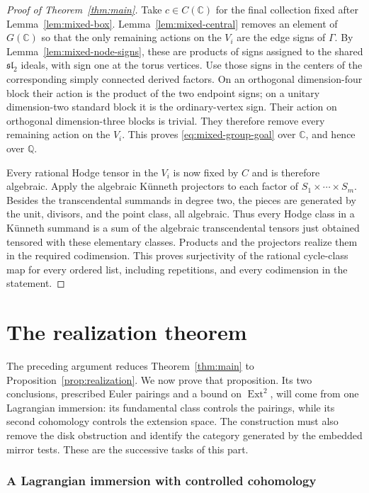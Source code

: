 \documentclass[11pt]{article}
\numberwithin{equation}{section}
\theoremstyle{definition}
\theoremstyle{remark}
\newcommand{\Q}{\mathbb Q}
\newcommand{\C}{\mathbb C}
\DeclareMathOperator{\Ext}{Ext}
\begin{document}
\begin{proof}[Proof of Theorem~\ref{thm:main}]
Take $c\in C(\C)$ for the final collection fixed after
Lemma~\ref{lem:mixed-box}.  Lemma~\ref{lem:mixed-central} removes
an element of $G(\C)$ so that the only remaining actions on the
$V_i$ are the edge signs of $\Gamma$.  By
Lemma~\ref{lem:mixed-node-signs}, these are products of signs
assigned to the shared $\mathfrak{sl}_2$ ideals, with sign one at
the torus vertices.  Use those signs in the centers of the
corresponding simply connected derived factors.  On an orthogonal
dimension-four block their action is the product of the two
endpoint signs; on a unitary dimension-two standard block it is
the ordinary-vertex sign.  Their action on orthogonal
dimension-three blocks is trivial.  They therefore remove every
remaining action on the $V_i$.  This proves
\eqref{eq:mixed-group-goal} over $\C$, and hence over $\Q$.

Every rational Hodge tensor in the $V_i$ is now fixed by $C$ and
is therefore algebraic.  Apply the algebraic K\"unneth projectors
to each factor of $S_1\times\cdots\times S_m$.  Besides the
transcendental summands in degree two, the pieces are generated by
the unit, divisors, and the point class, all algebraic.  Thus every
Hodge class in a K\"unneth summand is a sum of the algebraic
transcendental tensors just obtained tensored with these elementary
classes.  Products and the projectors realize them in the required
codimension.  This proves surjectivity of the rational cycle-class
map for every ordered list, including repetitions, and every
codimension in the statement.
\end{proof}


\part{The realization theorem}
\label{part:realization}

The preceding argument reduces Theorem~\ref{thm:main} to
Proposition~\ref{prop:realization}.  We now prove that proposition.
Its two conclusions, prescribed Euler pairings and a bound on
\(\Ext^2\), will come from one Lagrangian immersion: its fundamental
class controls the pairings, while its second cohomology controls the
extension space.  The construction must also remove the disk
obstruction and identify the category generated by the embedded mirror
tests.  These are the successive tasks of this part.

\section{A Lagrangian immersion with controlled cohomology}
\label{sec:topology}
\end{document}
